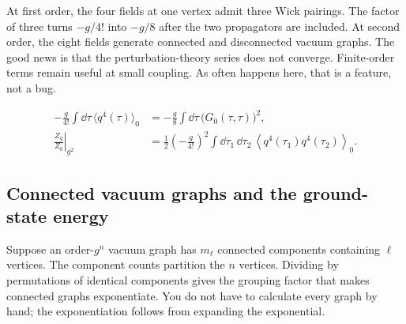 At first order, the four fields at one vertex admit three Wick pairings. The factor of three turns $-g/4!$ into $-g/8$ after the two propagators are included. At second order, the eight fields generate connected and disconnected vacuum graphs. The good news is that the perturbation-theory series does not converge. Finite-order terms remain useful at small coupling. As often happens here, that is a feature, not a bug.

\begin{align}
  -\frac{g}{4!}\int \dd\tau\,\langle q^4(\tau)\rangle_0
  &=-\frac{g}{8}\int \dd\tau\,\bigl(G_0(\tau,\tau)\bigr)^2,
  \label{eq:253a-ch02-first-vacuum-graph}\\
  \left.\frac{Z_g}{Z_0}\right|_{g^2}
  &=\frac12\left(-\frac{g}{4!}\right)^2
  \int \dd\tau_1\,\dd\tau_2\,
  \left\langle q^4(\tau_1)q^4(\tau_2)\right\rangle_0.
  \label{eq:253a-ch02-second-order-vacuum-graphs}
\end{align}

\subsection{Connected vacuum graphs and the ground-state energy}

Suppose an order-$g^n$ vacuum graph has $m_\ell$ connected components containing $\ell$ vertices. The component counts partition the $n$ vertices. Dividing by permutations of identical components gives the grouping factor that makes connected graphs exponentiate. You do not have to calculate every graph by hand; the exponentiation follows from expanding the exponential.

